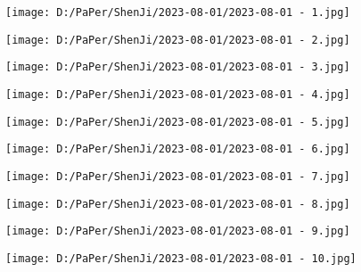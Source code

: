 \documentclass{article}
\begin{document}
\begin{figure}[h!]
	\centering
	\texttt{[image: D:/PaPer/ShenJi/2023-08-01/2023-08-01 - 1.jpg]}
\end{figure}

\begin{figure}[h!]
	\centering
	\texttt{[image: D:/PaPer/ShenJi/2023-08-01/2023-08-01 - 2.jpg]}
\end{figure}

\begin{figure}[h!]
	\centering
	\texttt{[image: D:/PaPer/ShenJi/2023-08-01/2023-08-01 - 3.jpg]}
\end{figure}

\begin{figure}[h!]
	\centering
	\texttt{[image: D:/PaPer/ShenJi/2023-08-01/2023-08-01 - 4.jpg]}
\end{figure}

\begin{figure}[h!]
	\centering
	\texttt{[image: D:/PaPer/ShenJi/2023-08-01/2023-08-01 - 5.jpg]}
\end{figure}

\begin{figure}[h!]
	\centering
	\texttt{[image: D:/PaPer/ShenJi/2023-08-01/2023-08-01 - 6.jpg]}
\end{figure}

\begin{figure}[h!]
	\centering
	\texttt{[image: D:/PaPer/ShenJi/2023-08-01/2023-08-01 - 7.jpg]}
\end{figure}

\begin{figure}[h!]
	\centering
	\texttt{[image: D:/PaPer/ShenJi/2023-08-01/2023-08-01 - 8.jpg]}
\end{figure}

\begin{figure}[h!]
	\centering
	\texttt{[image: D:/PaPer/ShenJi/2023-08-01/2023-08-01 - 9.jpg]}
\end{figure}

\begin{figure}[h!]
	\centering
	\texttt{[image: D:/PaPer/ShenJi/2023-08-01/2023-08-01 - 10.jpg]}
\end{figure}
\end{document}
